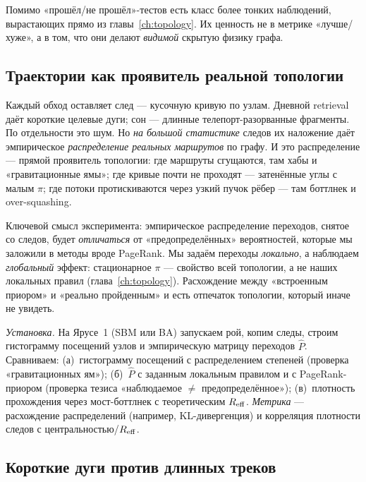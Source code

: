 Помимо «прошёл/не прошёл»-тестов есть класс более тонких наблюдений, вырастающих
прямо из главы~\ref{ch:topology}. Их ценность не в метрике «лучше/хуже», а в том,
что они делают \emph{видимой} скрытую физику графа.

\subsection{Траектории как проявитель реальной топологии}

Каждый обход оставляет след — кусочную кривую по узлам. Дневной retrieval даёт
короткие целевые дуги; сон — длинные телепорт-разорванные фрагменты. По отдельности
это шум. Но \emph{на большой статистике} следов их наложение даёт эмпирическое
\emph{распределение реальных маршрутов} по графу. И это распределение — прямой
проявитель топологии: где маршруты сгущаются, там хабы и «гравитационные ямы»; где
кривые почти не проходят — затенённые углы с малым $\pi$; где потоки протискиваются
через узкий пучок рёбер — там боттлнек и over-squashing.

\begin{principle}
Ключевой смысл эксперимента: эмпирическое распределение переходов, снятое со следов,
будет \emph{отличаться} от «предопределённых» вероятностей, которые мы заложили в
методы вроде PageRank. Мы задаём переходы \emph{локально}, а наблюдаем \emph{глобальный}
эффект: стационарное $\pi$ — свойство всей топологии, а не наших локальных правил
(глава~\ref{ch:topology}). Расхождение между «встроенным приором» и «реально
пройденным» и есть отпечаток топологии, который иначе не увидеть.
\end{principle}

\emph{Установка.} На Ярусе~1 (SBM или BA) запускаем рой, копим следы, строим
гистограмму посещений узлов и эмпирическую матрицу переходов $\hat P$. Сравниваем:
(а)~гистограмму посещений с распределением степеней (проверка «гравитационных ям»);
(б)~$\hat P$ с заданным локальным правилом и с PageRank-приором (проверка тезиса
«наблюдаемое $\ne$ предопределённое»); (в)~плотность прохождения через мост-боттлнек с
теоретическим $R_{\mathrm{eff}}$. \emph{Метрика} — расхождение распределений (например,
KL-дивергенция) и корреляция плотности следов с центральностью/$R_{\mathrm{eff}}$.

\subsection{Короткие дуги против длинных треков}

